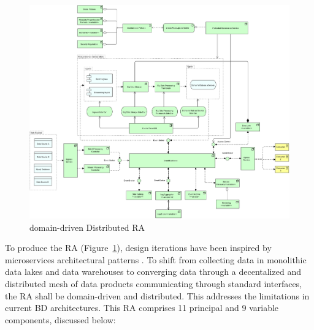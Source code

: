 \documentclass[a4paper,11pt]{article}
\let\cite\citep
\begin{document}
\begin{figure}[h!t]
    \includegraphics[width=\linewidth]{media/Metamycelium.jpg}
    \caption{domain-driven Distributed RA}
    \label{fig-RA}
\end{figure}

To produce the RA (Figure~\ref{fig-RA}), design iterations have been inspired by microservices architectural patterns \cite{richardson2018microservices}. To shift from collecting data in monolithic data lakes and data warehouses to converging data through a decentalized and distributed mesh of data products communicating through standard interfaces, the RA shall be domain-driven and distributed. This addresses the limitations in current BD architectures. This RA comprises 11 principal and 9 variable components, discussed below:
\end{document}

